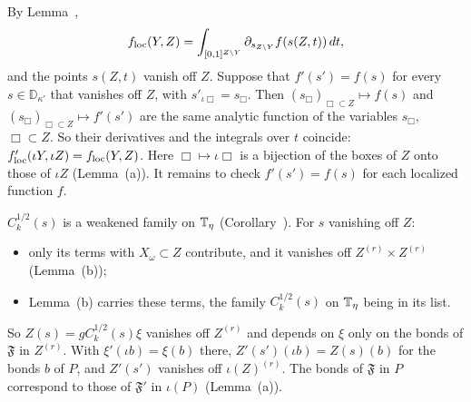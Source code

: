 \begin{step}
By Lemma~,
\[
f_{\rm loc}(Y,Z)=\int_{[0,1]^{Z\setminus Y}}\partial_{s_{Z\setminus Y}}f(s(Z,t))\,dt,
\]
and the points $s(Z,t)$ vanish off $Z$. Suppose that $f'(s')=f(s)$ for every $s\in\mathbb D_{\kappa'}$ that vanishes off $Z$, with $s'_{\iota\Box}=s_\Box$. Then $(s_\Box)_{\Box\subset Z}\mapsto f(s)$ and $(s_\Box)_{\Box\subset Z}\mapsto f'(s')$ are the same analytic function of the variables $s_\Box$, $\Box\subset Z$. So their derivatives and the integrals over $t$ coincide: $f'_{\rm loc}(\iota Y,\iota Z)=f_{\rm loc}(Y,Z)$. Here $\Box\mapsto\iota\Box$ is a bijection of the boxes of $Z$ onto those of $\iota Z$ (Lemma~(a)). It remains to check $f'(s')=f(s)$ for each localized function $f$.
\end{step}

\begin{step}
$C_k^{1/2}(s)$ is a weakened family on $\mathbb T_\eta$ (Corollary~). For $s$ vanishing off $Z$:
\begin{itemize}
\item only its terms with $X_\omega\subset Z$ contribute, and it vanishes off $Z^{(r)}\times Z^{(r)}$ (Lemma~(b));
\item Lemma~(b) carries these terms, the family $C^{1/2}_k(s)$ on $\mathbb T_\eta$ being in its list.
\end{itemize}
So $Z(s)=gC_k^{1/2}(s)\xi$ vanishes off $Z^{(r)}$ and depends on $\xi$ only on the bonds of $\mathfrak F$ in $Z^{(r)}$. With $\xi'(\iota b)=\xi(b)$ there, $Z'(s')(\iota b)=Z(s)(b)$ for the bonds $b$ of $P$, and $Z'(s')$ vanishes off $\iota(Z)^{(r)}$. The bonds of $\mathfrak F$ in $P$ correspond to those of $\mathfrak F'$ in $\iota(P)$ (Lemma~(a)).
\end{step}

